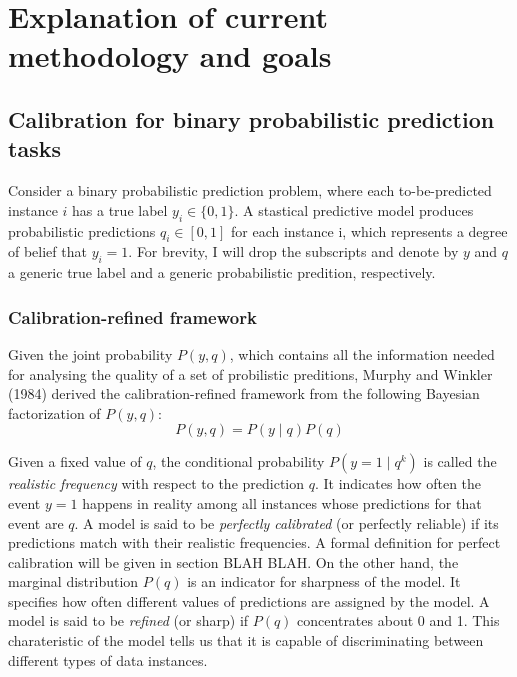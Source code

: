 \chapter{Explanation of current methodology and goals}

\section{Calibration for binary probabilistic prediction tasks}

Consider a binary probabilistic prediction problem, where each to-be-predicted instance $i$ has a true label $y_i \in \{0, 1\}$. A stastical predictive model produces probabilistic predictions $q_i \in [0, 1]$ for each instance i, which represents a degree of belief that $y_i=1$. For brevity, I will drop the subscripts and denote by $y$ and $q$ a generic true label and a generic probabilistic predition, respectively. 

\subsection{Calibration-refined framework}

Given the joint probability $P(y, q)$, which contains all the information needed for analysing the quality of a set of probilistic preditions, Murphy and Winkler (1984) derived the calibration-refined framework from the following Bayesian factorization of $P(y, q)$:
\begin{equation}
  P(y, q) = P(y \mid q)P(q)
  \label{eqn:calib-ref-factor}
\end{equation}

Given a fixed value of $q$, the conditional probability $P(y = 1 \mid q^k)$ is called the \textit{realistic frequency} with respect to the prediction $q$. It indicates how often the event $y=1$ happens in reality among all instances whose predictions for that event are $q$. A model is said to be \textit{perfectly calibrated} (or perfectly reliable) if its predictions match with their realistic frequencies. A formal definition for perfect calibration will be given in section BLAH BLAH. On the other hand, the marginal distribution $P(q)$ is an indicator for sharpness of the model. It specifies how often different values of predictions are assigned by the model. A model is said to be \textit{refined} (or sharp) if $P(q)$ concentrates about 0 and 1. This charateristic of the model tells us that it is capable of discriminating between different types of data instances.   

